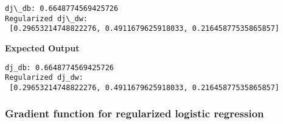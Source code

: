 \documentclass[11pt]{article}
\begin{document}
    \begin{Verbatim}[commandchars=\\\{\}]
dj\_db: 0.6648774569425726
Regularized dj\_dw:
 [0.29653214748822276, 0.4911679625918033, 0.21645877535865857]
    \end{Verbatim}

    \textbf{Expected Output}

\begin{verbatim}
dj_db: 0.6648774569425726
Regularized dj_dw:
 [0.29653214748822276, 0.4911679625918033, 0.21645877535865857]
\end{verbatim}

    \hypertarget{gradient-function-for-regularized-logistic-regression}{%
\subsubsection{Gradient function for regularized logistic
regression}\label{gradient-function-for-regularized-logistic-regression}}
\end{document}
